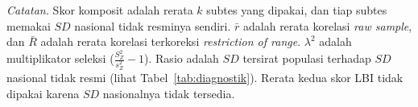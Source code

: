 \begin{table}[H]
    \centering
    \caption{Analisis Sensitivitas Thorndike Case III terhadap Perlakuan LBI pada Skor Komposit}
    \label{tab:sens_thorndike}
    \begin{spacing}{1.0}
    \end{spacing}
    \vspace{2mm}
    \begin{flushleft}
    \footnotesize\textit{Catatan.} Skor komposit adalah rerata $k$ subtes yang dipakai, dan tiap subtes memakai $SD$ nasional tidak resminya sendiri. $\bar{r}$ adalah rerata korelasi \textit{raw sample}, dan $\bar{R}$ adalah rerata korelasi terkoreksi \textit{restriction of range}. $\lambda^2$ adalah multiplikator seleksi ($\frac{S_Z^2}{s_Z^2} - 1$). Rasio adalah $SD$ tersirat populasi terhadap $SD$ nasional tidak resmi (lihat Tabel~\ref{tab:diagnostik}). Rerata kedua skor LBI tidak dipakai karena $SD$ nasionalnya tidak tersedia.
    \end{flushleft}
\end{table}
